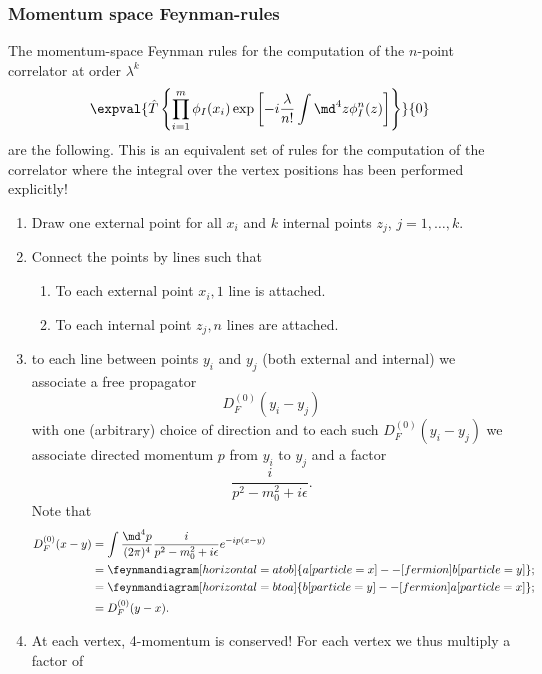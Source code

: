 \subsubsection{Momentum space Feynman-rules}
The momentum-space Feynman rules for the computation of the $n$-point correlator at order $\lambda^k$
\begin{equation}
\expval{\hat{T} \left\{ \prod_{i=1}^{m} \phi_I(x_i) \exp\left[-i  \frac{\lambda}{n!} \int \md^4 z \phi^n_I(z) \right] 	\right\}}{0}
\end{equation}
are the following. This is an equivalent set of rules for the computation of the correlator where the integral over the vertex positions has been performed explicitly!
\begin{enumerate}
	\item Draw one external point for all $x_i$ and $k$ internal points $z_j$, $j=1,\dots,k$.
	\item Connect the points by lines such that
	\begin{enumerate}
		\item To each external point $x_i, 1$ line is attached.
		\item To each internal point $z_j, n$ lines are attached.
	\end{enumerate}
\item to each line between points $y_i$ and $y_j$ (both external and internal) we associate a free propagator 
\begin{equation}
	D^{(0)}_F(y_i-y_j)
\end{equation}
with one (arbitrary) choice of direction and to each such $D^{(0)}_F(y_i-y_j)$ we associate directed momentum $p$ from $y_i$ to $y_j$ and a factor
\begin{equation}
	\frac{i}{p^2-m^2_0+i \epsilon}.
\end{equation}
Note that 
\begin{align*}
	D^{(0)}_F (x-y) &= \int \frac{\md^4p}{(2 \pi)^4} \frac{i}{p^2-m^2_0+i \epsilon} e^{-i p(x-y)} \\
								&=\feynmandiagram [horizontal=a to b] {a[particle=x] -- [fermion] b[particle=y]}; \\
								&=\feynmandiagram [horizontal=b to a] {b[particle=y] --  [fermion]a[particle=x]};\\
						&=D^{(0)}_F (y-x).
\end{align*}
\item At each vertex, 4-momentum is conserved! For each vertex we thus multiply a factor of 
\begin{equation}

\end{equation}
\end{enumerate}
